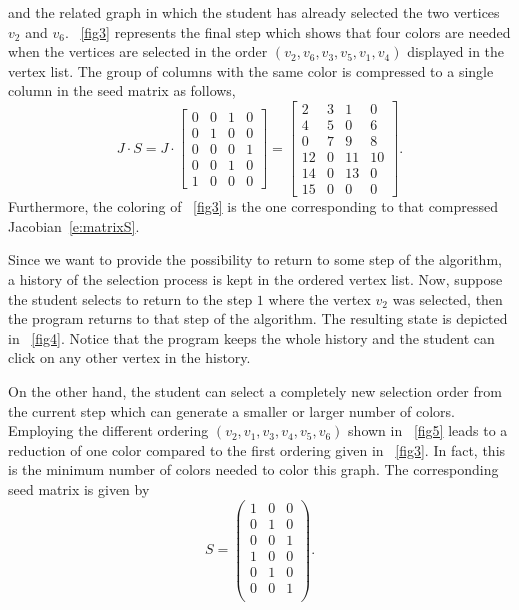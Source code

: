 \documentclass[12pt, twoside,a4paper,toc=bibliography]{scrbook}
\begin{document}
and the related graph in which the student has already selected the two vertices $v_2$ and $v_6$. \figurename~\ref{fig3} represents the final step which shows that four colors are needed when the vertices are selected in the order $(v_2, v_6, v_3, v_5, v_1, v_4)$ displayed in the vertex list. The group of columns with the same color is compressed to a single column in the seed matrix as follows,
\begin{equation}
\label{e:matrixS}
J \cdot S =
J \cdot
\begin{bmatrix}
0 & 0 & 1 & 0 \\
0 & 1 & 0 & 0 \\
0 & 0 & 0 & 1 \\
0 & 0 & 1 & 0 \\
1 & 0 & 0 & 0
\end{bmatrix}
=
\begin{bmatrix}
2 & 3 & 1 & 0 \\
4 & 5 & 0 & 6 \\
0 & 7 & 9 & 8 \\
12 & 0 & 11 & 10\\
14 & 0 & 13 & 0 \\
15 & 0 & 0 & 0
\end{bmatrix}.
\end{equation}
Furthermore, the coloring of \figurename~\ref{fig3} is the one corresponding to that compressed Jacobian~\eqref{e:matrixS}.

Since we want to provide the possibility to return to some step of the algorithm, a history of the selection process is kept in the ordered vertex list. Now, suppose the student selects to return to the step $1$ where the vertex $v_2$ was selected, then the program returns to that step of the algorithm. The resulting state is depicted in \figurename~\ref{fig4}. Notice that the program keeps the whole history and the student can click on any other vertex in the history.

On the other hand, the student can select a completely new selection order from the current step which can generate a smaller or larger number of colors. Employing the different ordering $(v_2,v_1,v_3,v_4,v_5,v_6)$ shown in \figurename~\ref{fig5} leads to a reduction of one color compared to the first ordering given in \figurename~\ref{fig3}. In fact, this is the minimum number of colors needed to color this graph. The corresponding seed matrix is given by
$$
S =
\begin{pmatrix}
1 & 0 & 0 \\
0 & 1 & 0 \\
0 & 0 & 1 \\
1 & 0 & 0 \\
0 & 1 & 0 \\
0 & 0 & 1 \\
\end{pmatrix}.
$$
\end{document}
